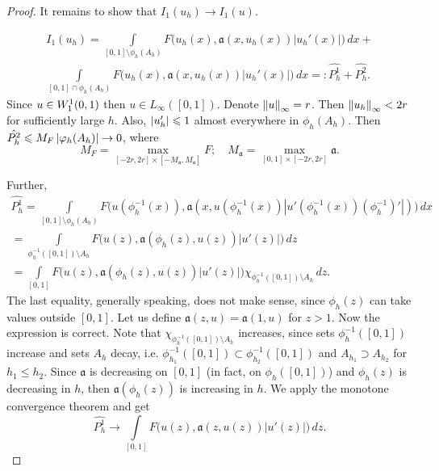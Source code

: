 \begin{proof}
It remains to show that $I_1( u_h ) \to I_1( u )$.

\begin{multline*}
I_1( u_h ) = \int\limits_{[0, 1] \setminus \phi_h( A_h )} F\big( u_h( x ), \mathfrak a( x, u_h(x) ) |u_h'( x )| \big) \, dx +\\
\int\limits_{[0, 1] \cap \phi_h( A_h )} F\big( u_h( x ), \mathfrak a( x, u_h(x) ) |u_h'( x )| \big) \, dx =: \hat{P_h^1} + \hat{P_h^2}.
\end{multline*}
Since $u \in W_1^1(0, 1)$ then $u \in L_\infty( [0, 1] )$.
Denote $\left\Vert u\right\Vert_\infty = r$.
Then $\left\Vert u_h\right\Vert_\infty < 2r$ for sufficiently large $h$.
Also, $\left\vert u_h'\right\vert \leqslant 1$ almost everywhere in $\phi_h( A_h )$.
Then $\hat{P_h^2} \leqslant M_F \left\vert\varphi_h( A_h )\right\vert \to 0$, where
$$M_F = \max\limits_{[-2r, 2r] \times [-M_{\mathfrak a}, M_{\mathfrak a}]} F;\quad M_{\mathfrak a} = \max\limits_{[0, 1] \times [-2r, 2r]} \mathfrak a.$$

Further,
\begin{multline*}
\hat{P_h^1} = \int\limits_{ [0, 1] \setminus \phi_h( A_h ) }
	F\big( u( \phi_h^{-1}( x ) ), \mathfrak a( x, u( \phi_h^{-1}( x ) ) |u'( \phi_h^{-1}( x ) ) ( \phi_h^{-1} )'| ) \big) \, dx
\\ =\int\limits_{ \phi_h^{-1}( [0, 1] ) \setminus A_h } F\big( u( z ), \mathfrak a( \phi_h( z ), u( z ) ) |u'( z )| \big) \, dz
\\ = \int\limits_{ [0, 1] } F\big( u( z ), \mathfrak a( \phi_h( z ), u( z ) ) |u'( z )| \big) \chi_{ \phi_h^{-1}( [0, 1] ) \setminus A_h } \, dz.
\end{multline*}
The last equality, generally speaking, does not make sense, since $\phi_h( z )$ can take values outside $[0, 1]$.
Let us define $\mathfrak a( z, u ) = \mathfrak a( 1, u )$ for $z > 1$. Now the expression is correct.
Note that $\chi_{\phi_h^{-1}( [0, 1] ) \setminus A_h}$ increases,
since sets $\phi_h^{-1}( [0, 1] )$ increase and sets $A_h$ decay,
i.e. $\phi_{h_1}^{-1}( [0, 1] ) \subset \phi_{h_2}^{-1}( [0, 1] )$ and $A_{h_1} \supset A_{h_2}$ for $h_1 \le h_2$.
Since $\mathfrak a$ is decreasing on $[0, 1]$ (in fact, on $\phi_h( [0, 1] )$) and $\phi_h( z )$ is decreasing in $h$,
then $\mathfrak a( \phi_h( z ) )$ is increasing in $h$.
We apply the monotone convergence theorem and get
$$\hat{P_h^1} \to \int\limits_{[0, 1]} F\big( u( z ), \mathfrak a( z, u( z ) ) |u'( z )| \big) \, dz.$$

\end{proof}

